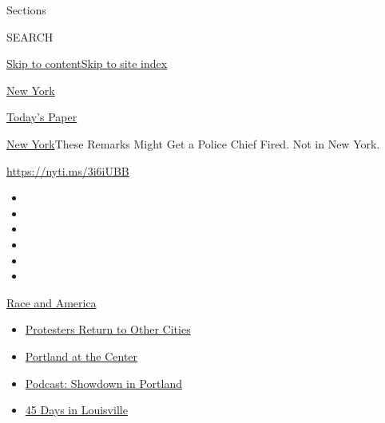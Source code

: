 Sections

SEARCH

\protect\hyperlink{site-content}{Skip to
content}\protect\hyperlink{site-index}{Skip to site index}

\href{https://www.nytimes.com/section/nyregion}{New York}

\href{https://myaccount.nytimes.com/auth/login?response_type=cookie\&client_id=vi}{}

\href{https://www.nytimes.com/section/todayspaper}{Today's Paper}

\href{/section/nyregion}{New York}\textbar{}These Remarks Might Get a
Police Chief Fired. Not in New York.

\url{https://nyti.ms/3i6iUBB}

\begin{itemize}
\item
\item
\item
\item
\item
\item
\end{itemize}

\href{https://www.nytimes.com/news-event/george-floyd-protests-minneapolis-new-york-los-angeles?action=click\&pgtype=Article\&state=default\&region=TOP_BANNER\&context=storylines_menu}{Race
and America}

\begin{itemize}
\tightlist
\item
  \href{https://www.nytimes.com/2020/07/26/us/protests-portland-seattle-trump.html?action=click\&pgtype=Article\&state=default\&region=TOP_BANNER\&context=storylines_menu}{Protesters
  Return to Other Cities}
\item
  \href{https://www.nytimes.com/2020/07/24/us/portland-oregon-protests-white-race.html?action=click\&pgtype=Article\&state=default\&region=TOP_BANNER\&context=storylines_menu}{Portland
  at the Center}
\item
  \href{https://www.nytimes.com/2020/07/23/podcasts/the-daily/portland-protests.html?action=click\&pgtype=Article\&state=default\&region=TOP_BANNER\&context=storylines_menu}{Podcast:
  Showdown in Portland}
\item
  \href{https://www.nytimes.com/interactive/2020/07/16/us/black-lives-matter-protests-louisville-breonna-taylor.html?action=click\&pgtype=Article\&state=default\&region=TOP_BANNER\&context=storylines_menu}{45
  Days in Louisville}
\end{itemize}

